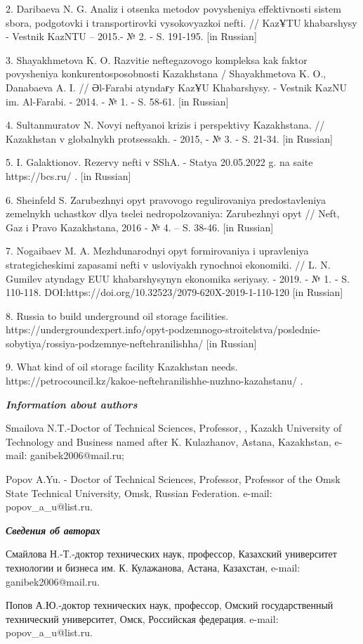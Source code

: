 2. Daribaeva N. G. Analiz i otsenka metodov povysheniya effektivnosti
sistem sbora, podgotovki i transportirovki vysokovyazkoi nefti. //
KazҰTU khabarshysy - Vestnik KazNTU -- 2015.- № 2. - S. 191-195. {[}in
Russian{]}

3. Shayakhmetova K. O. Razvitie neftegazovogo kompleksa kak faktor
povysheniya konkurentosposobnosti Kazakhstana / Shayakhmetova K. O.,
Danabaeva A. I. // Әl-Farabi atyndaғy KazҰU Khabarshysy. - Vestnik KazNU
im. Al\textquotesingle-Farabi. - 2014. - № 1. - S. 58-61. {[}in
Russian{]}

4. Sultanmuratov N. Novyi neftyanoi krizis i perspektivy Kazakhstana. //
Kazakhstan v global\textquotesingle nykh protsessakh. - 2015, - № 3. -
S. 21-34. {[}in Russian{]}

5. I. Galaktionov. Rezervy nefti v SShA. - Stat\textquotesingle ya
20.05.2022 g. na saite https://bcs.ru/ . {[}in Russian{]}

6. Sheinfel\textquotesingle d S. Zarubezhnyi opyt pravovogo
regulirovaniya predostavleniya zemel\textquotesingle nykh uchastkov dlya
tselei nedropol\textquotesingle zovaniya: Zarubezhnyi opyt //
Neft\textquotesingle, Gaz i Pravo Kazakhstana, 2016 - № 4. -- S. 38-46.
{[}in Russian{]}

7. Nogaibaev M. A. Mezhdunarodnyi opyt formirovaniya i upravleniya
strategicheskimi zapasami nefti v usloviyakh rynochnoi ekonomiki. // L.
N. Gumilev atyndagy EUU khabarshysynyn ekonomika seriyasy. - 2019. - №
1. - S. 110-118. DOI:https://doi.org/10.32523/2079-620X-2019-1-110-120
{[}in Russian{]}

8. Russia to build underground oil storage facilities.
https://undergroundexpert.info/opyt-podzemnogo-stroitelstva/poslednie-sobytiya/rossiya-podzemnye-neftehranilishha/
{[}in Russian{]}

9. What kind of oil storage facility Kazakhstan needs.
https://petrocouncil.kz/kakoe-neftehranilishhe-nuzhno-kazahstanu/ .

\emph{{\bfseries Information about authors}}

Smailova N.T.-Doctor of Technical Sciences, Professor, , Kazakh
University of Technology and Business named after K. Kulazhanov, Astana,
Kazakhstan, e-mail: ganibek2006@mail.ru;

Popov A.Yu. - Doctor of Technical Sciences, Professor, Professor of the
Omsk State Technical University, Omsk, Russian Federation. e-mail:
popov\_a\_u@list.ru.

\emph{{\bfseries Сведения об авторах}}

Смайлова Н.-Т.-доктор технических наук, профессор, Казахский университет
технологии и бизнеса им. К. Кулажанова, Астана, Казахстан, e-mail:
ganibek2006@mail.ru.

Попов А.Ю.-доктор технических наук, профессор, Омский государственный
технический университет, Омск, Российская федерация. e-mail:
popov\_a\_u@list.ru.


